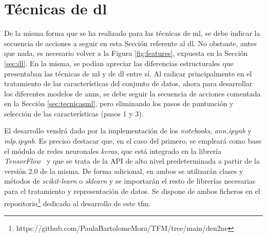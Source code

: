\section{Técnicas de \gls{dl}}
\label{sec:tecnicasdl}

De la misma forma que se ha realizado para las técnicas de \gls{ml}, se debe indicar la secuencia de acciones a seguir en esta Sección referente al \gls{dl}. No obstante, antes que nada, es necesario volver a la Figura \ref{fig:features}, expuesta en la Sección \ref{sec:dl}. En la misma, se podían apreciar las diferencias estructurales que presentaban las técnicas de \gls{ml} y de \gls{dl} entre sí. Al radicar principalmente en el tratamiento de las características del conjunto de datos, ahora para desarrollar los diferentes modelos de \gls{ann}s, se debe seguir la secuencia de acciones comentada en la Sección \ref{sec:tecnicasml}, pero eliminando los pasos de puntuación y selección de las características (pasos 1 y 3).

\vspace{3mm}

El desarrollo vendrá dado por la implementación de los \textit{notebooks}, \textit{ann.ipynb} y \textit{mlp.ipynb}. Es preciso destacar que, en el caso del primero, se empleará como base el módulo de redes neuronales \textit{keras}, que está integrado en la librería \textit{TensorFlow}~\cite{tensorflow} y que se trata de la API de alto nivel predeterminada a partir de la versión 2.0 de la misma. De forma adicional, en ambos se utilizarán clases y métodos de \textit{scikit-learn} o \textit{sklearn} y se importarán el resto de librerías necesarias para el tratamiento y representación de datos. Se dispone de ambos ficheros en el repositorio\footnote{https://github.com/PaulaBartolomeMora/TFM/tree/main/den2ne} dedicado al desarrollo de este \gls{tfm}.




